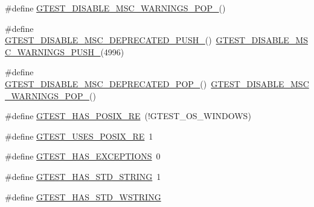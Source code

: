 \begin{DoxyCompactItemize}
\item 
\#define \mbox{\hyperlink{googletest-master_2googletest_2include_2gtest_2internal_2gtest-port_8h_ab4c44546d6d9aced68993b87b608fc06}{G\+T\+E\+S\+T\+\_\+\+D\+I\+S\+A\+B\+L\+E\+\_\+\+M\+S\+C\+\_\+\+W\+A\+R\+N\+I\+N\+G\+S\+\_\+\+P\+O\+P\+\_\+}}()
\item 
\#define \mbox{\hyperlink{googletest-master_2googletest_2include_2gtest_2internal_2gtest-port_8h_a5b130138db254deaf29dbe3dffa1a2a8}{G\+T\+E\+S\+T\+\_\+\+D\+I\+S\+A\+B\+L\+E\+\_\+\+M\+S\+C\+\_\+\+D\+E\+P\+R\+E\+C\+A\+T\+E\+D\+\_\+\+P\+U\+S\+H\+\_\+}}()~\mbox{\hyperlink{_obj__test_2lib_2googletest-release-1_88_81_2googletest_2src_2gtest-internal-inl_8h_a88f79832f9d045112a76e9da8611cc13}{G\+T\+E\+S\+T\+\_\+\+D\+I\+S\+A\+B\+L\+E\+\_\+\+M\+S\+C\+\_\+\+W\+A\+R\+N\+I\+N\+G\+S\+\_\+\+P\+U\+S\+H\+\_\+}}(4996)
\item 
\#define \mbox{\hyperlink{googletest-master_2googletest_2include_2gtest_2internal_2gtest-port_8h_aa0dc86dc9837f1610e91da65458f53b3}{G\+T\+E\+S\+T\+\_\+\+D\+I\+S\+A\+B\+L\+E\+\_\+\+M\+S\+C\+\_\+\+D\+E\+P\+R\+E\+C\+A\+T\+E\+D\+\_\+\+P\+O\+P\+\_\+}}()~\mbox{\hyperlink{_obj__test_2lib_2googletest-release-1_88_81_2googletest_2include_2gtest_2internal_2gtest-port_8h_ab4c44546d6d9aced68993b87b608fc06}{G\+T\+E\+S\+T\+\_\+\+D\+I\+S\+A\+B\+L\+E\+\_\+\+M\+S\+C\+\_\+\+W\+A\+R\+N\+I\+N\+G\+S\+\_\+\+P\+O\+P\+\_\+}}()
\item 
\#define \mbox{\hyperlink{googletest-master_2googletest_2include_2gtest_2internal_2gtest-port_8h_af5c4295ea1d76f07f65934f659792431}{G\+T\+E\+S\+T\+\_\+\+H\+A\+S\+\_\+\+P\+O\+S\+I\+X\+\_\+\+RE}}~(!G\+T\+E\+S\+T\+\_\+\+O\+S\+\_\+\+W\+I\+N\+D\+O\+WS)
\item 
\#define \mbox{\hyperlink{googletest-master_2googletest_2include_2gtest_2internal_2gtest-port_8h_acecef794eeb09598cd47da764271cb18}{G\+T\+E\+S\+T\+\_\+\+U\+S\+E\+S\+\_\+\+P\+O\+S\+I\+X\+\_\+\+RE}}~1
\item 
\#define \mbox{\hyperlink{googletest-master_2googletest_2include_2gtest_2internal_2gtest-port_8h_aedcf220690e6589d0fc2bd3db768ea66}{G\+T\+E\+S\+T\+\_\+\+H\+A\+S\+\_\+\+E\+X\+C\+E\+P\+T\+I\+O\+NS}}~0
\item 
\#define \mbox{\hyperlink{googletest-master_2googletest_2include_2gtest_2internal_2gtest-port_8h_adba1121430c11cee8ba0c74e8cf6aa40}{G\+T\+E\+S\+T\+\_\+\+H\+A\+S\+\_\+\+S\+T\+D\+\_\+\+S\+T\+R\+I\+NG}}~1
\item 
\#define \mbox{\hyperlink{googletest-master_2googletest_2include_2gtest_2internal_2gtest-port_8h_a6e087748d8bbd2ca57c487b6ad268670}{G\+T\+E\+S\+T\+\_\+\+H\+A\+S\+\_\+\+S\+T\+D\+\_\+\+W\+S\+T\+R\+I\+NG}}

\end{DoxyCompactItemize}
